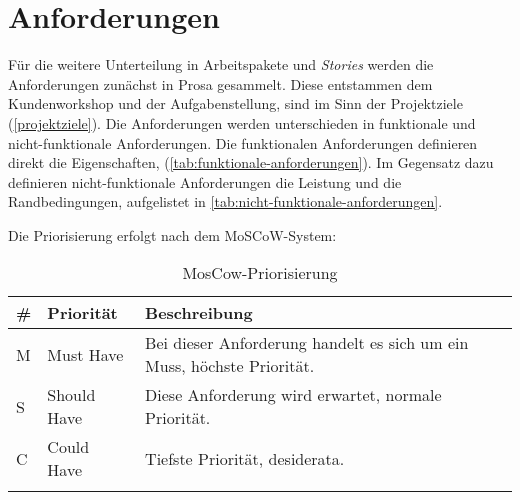 \section{Anforderungen} \label{anforderungen}

Für die weitere Unterteilung in Arbeitspakete und \textit{Stories} werden die Anforderungen zunächst in Prosa gesammelt. Diese entstammen dem Kundenworkshop und der Aufgabenstellung, sind im Sinn der Projektziele (\autoref{projektziele}). Die Anforderungen werden unterschieden in funktionale und nicht-funktionale Anforderungen. Die funktionalen Anforderungen definieren direkt die Eigenschaften, (\autoref{tab:funktionale-anforderungen}). Im Gegensatz dazu definieren nicht-funktionale Anforderungen die Leistung und die Randbedingungen, aufgelistet in \autoref{tab:nicht-funktionale-anforderungen}.

Die Priorisierung erfolgt nach dem \gls{MoSCoW-System}:

\begin{longtable}{|p{1.5cm} | p{2.5cm} | p{7.2cm}|}
  \hline
    \# & Priorität & Beschreibung \\\hline
    M & Must Have & Bei dieser Anforderung handelt es sich um ein Muss, höchste Priorität.\\\hline
    S & Should Have & Diese Anforderung wird erwartet, normale Priorität.\\\hline
    C & Could Have & Tiefste Priorität, desiderata.\\\hline
    \caption{MosCow-Priorisierung}
  \label{tab:moscow}
\end{longtable}


